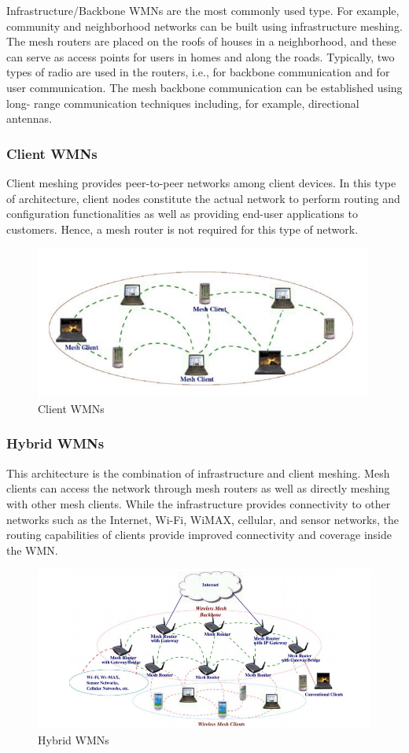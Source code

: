 \documentclass[12pt,a4paper]{report}
\begin{document}
Infrastructure/Backbone WMNs are the most commonly used type. For example,
community and neighborhood networks can be built using infrastructure meshing.
The mesh routers are placed on the roofs of houses in a neighborhood, and these
can serve as access points for users in homes and along the roads. Typically, two
types of radio are used in the routers, i.e., for backbone communication and for user
communication. The mesh backbone communication can be established using long-
range communication techniques including, for example, directional antennas.

\subsubsection{Client WMNs}
Client meshing provides peer-to-peer networks among client devices.
In this type of architecture, client nodes constitute the actual network to perform
routing and configuration functionalities as well as providing end-user applications to
customers. Hence, a mesh router is not required for this type of network.
\begin{figure}[hbtp]
\centering
\includegraphics[scale=1]{client-wmn.png}
\caption{Client WMNs}
\end{figure}


\subsubsection{Hybrid WMNs}
This architecture is the combination of infrastructure and client
meshing. Mesh clients can access the network through mesh
routers as well as directly meshing with other mesh clients. While the infrastructure
provides connectivity to other networks such as the Internet, Wi-Fi, WiMAX, cellular,
and sensor networks, the routing capabilities of clients provide improved connectivity
and coverage inside the WMN.
\begin{figure}[hbtp]
\centering
\includegraphics[scale=0.75]{hybrid-wmn.png}
\caption{Hybrid WMNs}
\end{figure}
\end{document}
